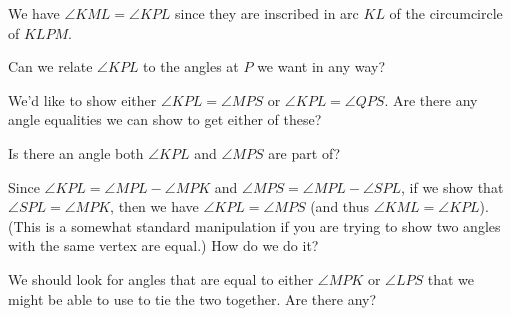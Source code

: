 
We have $\angle KML = \angle KPL$ since they are inscribed in arc $KL$ of the circumcircle of $KLPM$.

Can we relate $\angle KPL$ to the angles at $P$ we want in any way?

We'd like to show either $\angle KPL = \angle MPS$ or $\angle KPL = \angle QPS$. Are there any angle equalities we can show to get either of these?

Is there an angle both $\angle KPL$ and $\angle MPS$ are part of?











Since $\angle KPL = \angle MPL - \angle MPK$ and $\angle MPS = \angle MPL - \angle SPL$, if we show that $\angle SPL = \angle MPK$, then we have $\angle KPL = \angle MPS$ (and thus $\angle KML = \angle KPL$). (This is a somewhat standard manipulation if you are trying to show two angles with the same vertex are equal.) How do we do it?

We should look for angles that are equal to either $\angle MPK$ or $\angle LPS$ that we might be able to use to tie the two together. Are there any?

